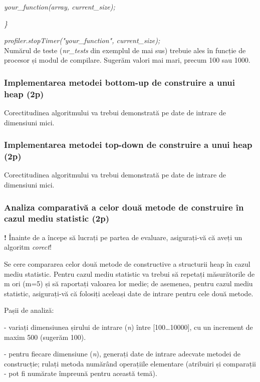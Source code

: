 \documentclass[../ro-fa-lab.tex]{subfiles}
\begin{document}
\quad\emph{your\_function(array, current\_size);}

\emph{\}}

\emph{profiler.stopTimer("your\_function", current\_size);}
\\


Numărul de teste (\emph{nr\_tests} din exemplul de mai sus) trebuie ales
în funcție de procesor și modul de compilare. Sugerăm valori mai mari,
precum 100 sau 1000.

\subsubsection{Implementarea metodei bottom-up de construire a unui heap
(2p)}\label{implementarea-metodei-bottom-up-de-construire-a-unui-heap-2p}

Corectitudinea algoritmului va trebui demonstrată pe date de intrare de
dimensiuni mici.

\subsubsection{Implementarea metodei top-down de construire a unui heap
(2p)}\label{implementarea-metodei-top-down-de-construire-a-unui-heap-2p}

Corectitudinea algoritmului va trebui demonstrată pe date de intrare de
dimensiuni mici.

\subsubsection{Analiza comparativă a celor două metode de construire în
cazul mediu statistic
(2p)}\label{analiza-comparativux103-a-celor-douux103-metode-de-construire-uxeen-cazul-mediu-statistic-2p}

\textbf{!} Înainte de a începe să lucrați pe partea de evaluare,
asigurați-vă că aveți un algoritm \emph{corect}!

Se cere compararea celor două metode de constructive a structurii heap
în cazul mediu statistic. Pentru cazul mediu statistic va trebui să
repetați măsurătorile de m ori (m=5) și să raportați valoarea lor medie;
de asemenea, pentru cazul mediu statistic, asigurați-vă că folosiți
aceleași date de intrare pentru cele două metode.

Pașii de analiză:

- variați dimensiunea șirului de intrare (\emph{n}) între
{[}100\ldots10000{]}, cu un increment de maxim 500 (sugerăm 100).

- pentru fiecare dimensiune (\emph{n}), generați date de intrare
adecvate metodei de construcție; rulați metoda numărând operațiile
elementare (atribuiri și comparații - pot fi numărate împreună pentru
această temă).
\end{document}
